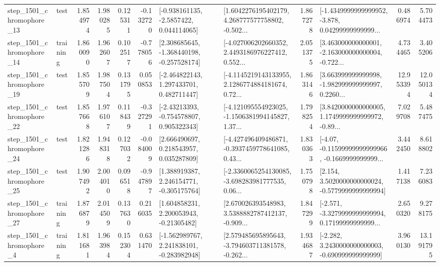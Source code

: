 \begin{tabular}{llrrrrllrlrr}
 step\_1501\_chromophore\_13 &      test &      1.854974 &    1.980285 &      0.125311 & -0.132720 &     [-0.938161135, -2.5857422, 0.044114065] &  [1.6042276195402179, 4.268777577758802, -0.502... &       1.867278 &  [-1.4349999999999952, -3.878, 0.04299999999999... &            0.486974 &          5.704473 \\
 step\_1501\_chromophore\_14 &  training &      1.860090 &    1.962607 &      0.102517 & -0.778056 &   [2.308685645, -1.368440198, -0.257528174] &  [-4.027006202660352, 2.4493186976227412, 0.552... &       2.051375 &  [3.463000000000001, -2.163000000000004, -0.722... &            4.734465 &          3.405206 \\
 step\_1501\_chromophore\_19 &      test &      1.855709 &    1.987504 &      0.131795 &  0.050853 &    [-2.464822143, 1.297433701, 0.482711447] &  [-4.1145219143133955, 2.1286774884181674, 0.72... &       1.863146 &  [3.663999999999998, -1.982999999999997, 0.2260... &           12.953394 &         12.050134 \\
 step\_1501\_chromophore\_22 &      test &      1.857668 &    1.976107 &      0.118439 & -0.327291 &    [-2.43213393, -0.754578807, 0.905322343] &  [-4.121095554923025, -1.1506381994145827, 1.37... &       1.798254 &  [3.8420000000000005, 1.1749999999999972, -0.89... &            7.029708 &          5.487475 \\
 step\_1501\_chromophore\_24 &      test &      1.821286 &    1.948318 &      0.127032 & -0.084009 &     [2.666490697, 0.218543957, 0.035287809] &  [-4.427496409486871, -0.3937459778641085, 0.43... &       1.830363 &  [-4.07, -0.11599999999999966, -0.1669999999999... &            3.442450 &          8.618802 \\
 step\_1501\_chromophore\_25 &      test &      1.907492 &    2.004010 &      0.096518 & -0.947897 &    [1.388919387, 2.246154771, -0.305175764] &  [-2.3360065254130085, -3.698283981777535, 0.06... &       1.750798 &   [2.154, 3.5020000000000024, -0.5779999999999994] &            1.417138 &          7.236083 \\
 step\_1501\_chromophore\_27 &  training &      1.876879 &    2.014509 &      0.137630 &  0.216035 &     [1.604858231, 2.200053943, -0.21305482] &  [2.670026393548983, 3.5388882787412137, -0.909... &       1.847299 &  [-2.571, -3.3279999999999994, 0.17199999999999... &            2.650320 &          9.278175 \\
  step\_1501\_chromophore\_4 &  training &      1.811681 &    1.963984 &      0.152304 &  0.631470 &   [-1.562989767, 2.241838101, -0.283982948] &  [2.579485695895643, -3.794603711381578, -0.262... &       1.934687 &   [-2.282, 3.2430000000000003, -0.690999999999999] &            3.960130 &         13.191795 \\

\end{tabular}
